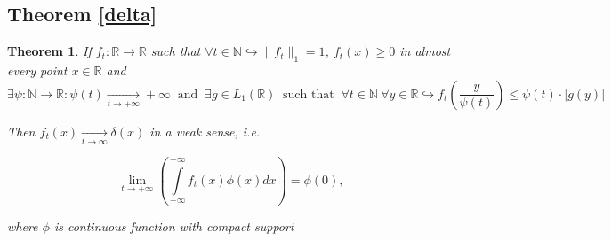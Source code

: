 \documentclass{article}
\newtheorem*{theorem-non}{Theorem}
\begin{document}
    \subsection{Theorem \ref{delta}} \label{pr_delta}
    \begin{theorem-non}
        If $f_t : \mathbb{R} \to \mathbb{R}$ such that $\forall t \in \mathbb{N} \hookrightarrow  \|f_t\|_1 = 1$, $f_t(x) \geq 0$ in almost every point $x \in \mathbb{R}$ and
        \begin{equation} \label{psi_and_g_A}
            \exists \psi : \mathbb{N} \to \mathbb{R} : \psi(t) \underset{t \to +\infty}{\longrightarrow} +\infty ~\text{ and }~
            \exists g \in L_1(\mathbb{R}) ~\text{ such that }~ \forall t \in \mathbb{N} ~\forall y \in \mathbb{R} \hookrightarrow f_t\left(\dfrac{y}{\psi(t)}\right) \leq \psi(t) \cdot |g(y)|
        \end{equation}

        Then $f_t(x) \underset{t \to \infty}{\longrightarrow} \delta(x)$ in a weak sense, i.e.

        \begin{equation}
            \underset{t \to +\infty}{\lim}\left(\int\limits_{-\infty}^{+\infty} f_t(x) \phi(x) dx\right) = \phi(0),
        \end{equation}

        where $\phi$ is continuous function with compact support
    \end{theorem-non}
\end{document}
